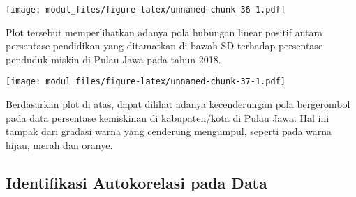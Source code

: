\documentclass[
]{book}
\newenvironment{Shaded}{\begin{snugshade}}{\end{snugshade}}
\newcommand{\DataTypeTok}[1]{\textcolor[rgb]{0.13,0.29,0.53}{#1}}
\newcommand{\DecValTok}[1]{\textcolor[rgb]{0.00,0.00,0.81}{#1}}
\newcommand{\KeywordTok}[1]{\textcolor[rgb]{0.13,0.29,0.53}{\textbf{#1}}}
\newcommand{\NormalTok}[1]{#1}
\newcommand{\OperatorTok}[1]{\textcolor[rgb]{0.81,0.36,0.00}{\textbf{#1}}}
\newcommand{\StringTok}[1]{\textcolor[rgb]{0.31,0.60,0.02}{#1}}
\begin{document}
\begin{Shaded}
\end{Shaded}

\texttt{[image: modul\_files/figure-latex/unnamed-chunk-36-1.pdf]}

Plot tersebut memperlihatkan adanya pola hubungan linear positif antara persentase pendidikan yang ditamatkan di bawah SD terhadap persentase penduduk miskin di Pulau Jawa pada tahun 2018.

\begin{Shaded}
\end{Shaded}

\texttt{[image: modul\_files/figure-latex/unnamed-chunk-37-1.pdf]}

Berdasarkan plot di atas, dapat dilihat adanya kecenderungan pola bergerombol pada data persentase kemiskinan di kabupaten/kota di Pulau Jawa. Hal ini tampak dari gradasi warna yang cenderung mengumpul, seperti pada warna hijau, merah dan oranye.

\hypertarget{identifikasi-autokorelasi-pada-data}{%
\subsection{Identifikasi Autokorelasi pada Data}\label{identifikasi-autokorelasi-pada-data}}
\end{document}
